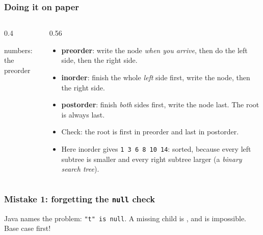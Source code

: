 \documentclass[aspectratio=169,10pt,compress]{beamer}
\begin{document}
\begin{frame}[t,fragile] \frametitle{Doing it on paper}
  \begin{columns}[T]
    \begin{column}{0.4\textwidth}
      \begin{center}
      \end{center}
      \small numbers: the preorder
    \end{column}
    \begin{column}{0.56\textwidth}
      \begin{itemize}\small
        \item \textbf{preorder}: write the node \emph{when you arrive}, then do the left side, then the right side.
        \item \textbf{inorder}: finish the whole \emph{left} side first, write the node, then the right side.
        \item \textbf{postorder}: finish \emph{both} sides first, write the node last. The root is always last.
        \item Check: the root is first in preorder and last in postorder.
        \item Here inorder gives \texttt{1 3 6 8 10 14}: sorted, because every left subtree is smaller and every right subtree larger
              (a \emph{binary search tree}).
      \end{itemize}
    \end{column}
  \end{columns}
\end{frame}





\begin{frame}[t,fragile] \frametitle{Mistake 1: forgetting the \texttt{null} check}

  \vspace{0.2em}
  \small Java names the problem: \texttt{"t" is null}. A missing child is , and  is impossible. Base case first!
\end{frame}
\end{document}
